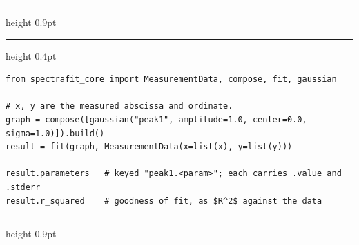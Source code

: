 \documentclass[border=6pt,varwidth=15.2cm]{standalone}
\begin{document}
\begin{minipage}{15.2cm}
\hrule height 0.9pt
\vspace{0.5em}
\vspace{0.2em}
\hrule height 0.4pt
\begin{lstlisting}
from spectrafit_core import MeasurementData, compose, fit, gaussian

# x, y are the measured abscissa and ordinate.
graph = compose([gaussian("peak1", amplitude=1.0, center=0.0, sigma=1.0)]).build()
result = fit(graph, MeasurementData(x=list(x), y=list(y)))

result.parameters   # keyed "peak1.<param>"; each carries .value and .stderr
result.r_squared    # goodness of fit, as $R^2$ against the data
\end{lstlisting}
\vspace{0.3em}
\hrule height 0.9pt
\end{minipage}
\end{document}

